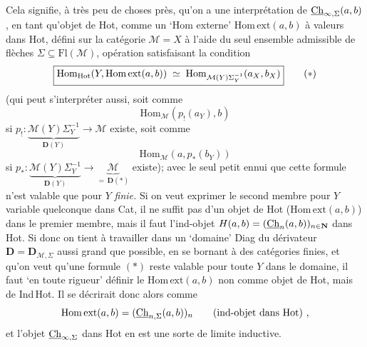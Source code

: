 Cela signifie, à très peu de choses près, qu'on a une interprétation de $\underline{\mathrm{Ch}}_{\infty,\Sigma}(a,b)$, en tant qu'objet de Hot, comme un `Hom externe' $\mathrm{Hom\,ext}(a,b)$ à valeurs dans Hot, défini sur la catégorie $\mathcal{M}=X$ à l'aide du seul ensemble admissible de flèches $\Sigma\subseteq\mathrm{Fl}(\mathcal{M})$, opération satisfaisant la condition
\[ \boxed{\mathrm{Hom}_{\mathrm{Hot}}(Y,\mathrm{Hom\,ext}(a,b)) \;\simeq\; \mathrm{Hom}_{\mathcal{M}(Y)\Sigma_Y^{-1}}(a_X,b_X)} \tag*{$(*)$} \]
(qui peut s'interpréter aussi, soit comme
\[ \mathrm{Hom}_{\mathcal{M}}(p_!(a_Y),b) \]
si $p_! : \underbrace{\mathcal{M}(Y)\Sigma_Y^{-1}}_{\mathbf{D}(Y)} \longrightarrow \mathcal{M}$ existe, soit comme
\[ \mathrm{Hom}_{\mathcal{M}}(a,p_*(b_Y)) \]
si $p_* : \underbrace{\mathcal{M}(Y)\Sigma_Y^{-1}}_{\mathbf{D}(Y)} \longrightarrow \underbrace{\mathcal{M}}_{=\,\mathbf{D}(*)}$ existe); avec le seul petit ennui que cette formule n'est valable que pour $Y$ \textit{finie.} Si on veut exprimer le second membre pour $Y$ variable quelconque dans Cat, il ne suffit pas d'un objet de Hot ($\mathrm{Hom\,ext}(a,b)$) dans le premier membre, mais il faut l'ind-objet $H(a,b) = (\underline{\mathrm{Ch}}_n(a,b))_{n\in\mathbf{N}}$ dans Hot. Si donc on tient à travailler dans un `domaine' Diag du dérivateur $\mathbf{D}=\mathbf{D}_{\mathcal{M},\Sigma}$ aussi grand que possible, en se bornant à des catégories finies,
et qu'on veut qu'une formule $(*)$ reste valable pour toute $Y$ dans le domaine, il faut `en toute rigueur' définir le $\mathrm{Hom\,ext}(a,b)$ non comme objet de Hot, mais de Ind\,Hot. Il se décrirait donc alors comme
\[ \mathrm{Hom\,ext}(a,b) = (\underline{\mathrm{Ch}}_{n,\Sigma}(a,b))_n \qquad \text{(ind-objet dans Hot)}\ , \]
et l'objet $\underline{\mathrm{Ch}}_{\infty,\Sigma}$ dans Hot en est une sorte de limite inductive.

